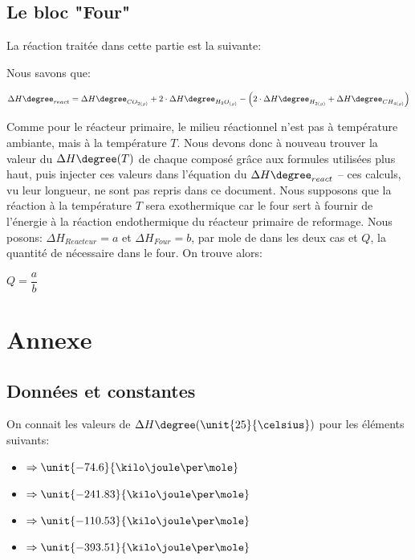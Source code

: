 \documentclass[11pt,a4paper]{report}
\begin{document}
\subsection*{Le bloc "Four"}
La réaction traitée dans cette partie est la suivante:


Nous savons que:

$\Delta H\degree_{react} = \Delta H\degree_{CO_{2(g)}} + 2\cdot \Delta H\degree_{H_{2}O_{(g)}} - \left(2\cdot \Delta H\degree_{H_{2(g)}} +
\Delta H\degree_{CH_{4(g)}}\right)$

Comme pour le réacteur primaire, le milieu réactionnel n'est pas à température ambiante, mais à la température $T$. 
Nous devons donc à nouveau trouver la valeur du $\Delta H\degree(T)$ de chaque composé grâce aux formules utilisées plus haut,
puis injecter ces valeurs dans l'équation du $\Delta H\degree_{react}$ -- ces calculs, vu leur longueur, ne sont pas repris dans
ce document.
Nous supposons que la réaction à la température $T$ sera exothermique car le four sert à fournir de l'énergie à la réaction
endothermique du réacteur primaire de reformage.
Nous posons: $\Delta H_{Reacteur} = a$ et $\Delta H_{Four} = b$, par mole de  dans les deux cas et $Q$, la quantité 
de  nécessaire dans le four.
On trouve alors:

$Q = \dfrac{a}{b}$



\section*{Annexe}
\subsection*{Données et constantes}
On connait les valeurs de $\Delta H\degree (\unit{25}{\celsius})$ pour les éléments suivants:

\begin{itemize}
\item{ $\Rightarrow \unit{-74.6}{\kilo\joule\per\mole}$}
\item{ $\Rightarrow \unit{-241.83}{\kilo\joule\per\mole}$}
\item{ $\Rightarrow \unit{-110.53}{\kilo\joule\per\mole}$}
\item{ $\Rightarrow \unit{-393.51}{\kilo\joule\per\mole}$}
\end{itemize}
\end{document}
